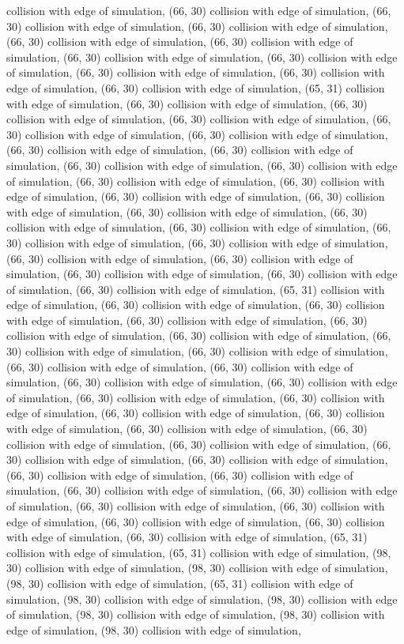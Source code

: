 collision with edge of simulation, (66, 30) collision with edge of simulation, (66, 30) collision with edge of simulation, (66, 30) collision with edge of simulation, (66, 30) collision with edge of simulation, (66, 30) collision with edge of simulation, (66, 30) collision with edge of simulation, (66, 30) collision with edge of simulation, (66, 30) collision with edge of simulation, (66, 30) collision with edge of simulation, (66, 30) collision with edge of simulation, (65, 31) collision with edge of simulation, (66, 30) collision with edge of simulation, (66, 30) collision with edge of simulation, (66, 30) collision with edge of simulation, (66, 30) collision with edge of simulation, (66, 30) collision with edge of simulation, (66, 30) collision with edge of simulation, (66, 30) collision with edge of simulation, (66, 30) collision with edge of simulation, (66, 30) collision with edge of simulation, (66, 30) collision with edge of simulation, (66, 30) collision with edge of simulation, (66, 30) collision with edge of simulation, (66, 30) collision with edge of simulation, (66, 30) collision with edge of simulation, (66, 30) collision with edge of simulation, (66, 30) collision with edge of simulation, (66, 30) collision with edge of simulation, (66, 30) collision with edge of simulation, (66, 30) collision with edge of simulation, (66, 30) collision with edge of simulation, (66, 30) collision with edge of simulation, (66, 30) collision with edge of simulation, (66, 30) collision with edge of simulation, (65, 31) collision with edge of simulation, (66, 30) collision with edge of simulation, (66, 30) collision with edge of simulation, (66, 30) collision with edge of simulation, (66, 30) collision with edge of simulation, (66, 30) collision with edge of simulation, (66, 30) collision with edge of simulation, (66, 30) collision with edge of simulation, (66, 30) collision with edge of simulation, (66, 30) collision with edge of simulation, (66, 30) collision with edge of simulation, (66, 30) collision with edge of simulation, (66, 30) collision with edge of simulation, (66, 30) collision with edge of simulation, (66, 30) collision with edge of simulation, (66, 30) collision with edge of simulation, (66, 30) collision with edge of simulation, (66, 30) collision with edge of simulation, (66, 30) collision with edge of simulation, (66, 30) collision with edge of simulation, (66, 30) collision with edge of simulation, (66, 30) collision with edge of simulation, (66, 30) collision with edge of simulation, (66, 30) collision with edge of simulation, (66, 30) collision with edge of simulation, (66, 30) collision with edge of simulation, (66, 30) collision with edge of simulation, (66, 30) collision with edge of simulation, (66, 30) collision with edge of simulation, (66, 30) collision with edge of simulation, (65, 31) collision with edge of simulation, (65, 31) collision with edge of simulation, (98, 30) collision with edge of simulation, (98, 30) collision with edge of simulation, (98, 30) collision with edge of simulation, (65, 31) collision with edge of simulation, (98, 30) collision with edge of simulation, (98, 30) collision with edge of simulation, (98, 30) collision with edge of simulation, (98, 30) collision with edge of simulation, (98, 30) collision with edge of simulation, 